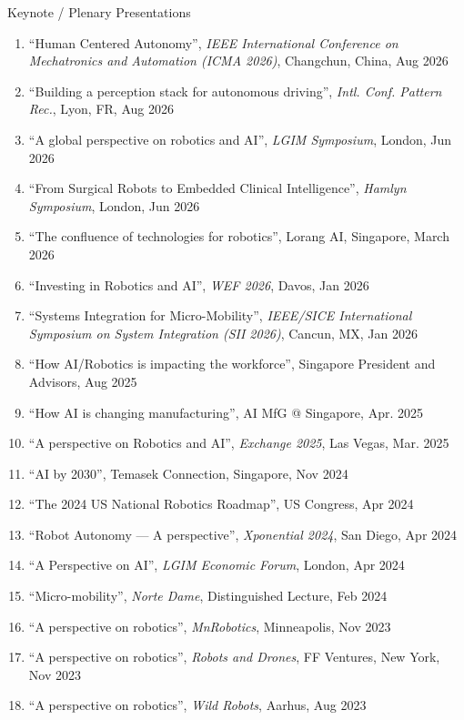 \documentclass{article}
\begin{document}
\begin{cv}
	\begin{cvlist}{Keynote / Plenary Presentations}
		\item
		\begin{enumerate}
      \item ``Human Centered Autonomy'', {\em IEEE International Conference on
            Mechatronics and Automation (ICMA 2026)}, Changchun, China, Aug 2026
      \item ``Building a perception stack for autonomous driving'', {\em Intl.
            Conf. Pattern Rec.}, Lyon, FR, Aug 2026
			\item ``A global perspective on robotics and AI'', {\em LGIM Symposium}, London, Jun 2026
			\item ``From Surgical Robots to Embedded Clinical Intelligence'', {\em Hamlyn Symposium}, London, Jun 2026
			\item ``The confluence of technologies for robotics'', {Lorang AI}, Singapore, March 2026
			\item ``Investing in Robotics and AI'', {\em WEF 2026}, Davos, Jan 2026
			\item ``Systems Integration for Micro-Mobility'', {\em IEEE/SICE International
				      Symposium on System Integration (SII 2026)}, Cancun, MX, Jan 2026
			\item ``How AI/Robotics is impacting the workforce'', Singapore President and Advisors, Aug 2025
			\item ``How AI is changing manufacturing'', AI MfG @ Singapore, Apr. 2025
			\item ``A perspective on Robotics and AI'', {\em Exchange 2025}, Las Vegas, Mar. 2025
			\item ``AI by 2030'', Temasek Connection, Singapore, Nov 2024
			\item ``The 2024 US National Robotics Roadmap'', US Congress, Apr 2024
			\item ``Robot Autonomy --- A perspective'', {\em Xponential 2024}, San Diego, Apr 2024
			\item ``A Perspective on AI'', {\em LGIM Economic Forum}, London, Apr 2024
			\item ``Micro-mobility'', {\em Norte Dame}, Distinguished Lecture, Feb 2024
			\item ``A perspective on robotics'', {\em MnRobotics}, Minneapolis, Nov 2023
			\item ``A perspective on robotics'', {\em Robots and Drones}, FF Ventures, New
			      York, Nov 2023
			\item ``A perspective on robotics'', {\em Wild Robots}, Aarhus, Aug 2023

\end{enumerate}
\end{cvlist}
\end{cv}
\end{document}
